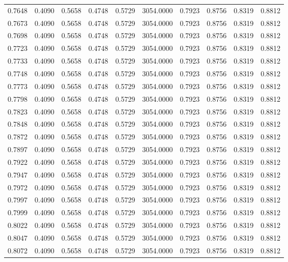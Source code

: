 \begin{tabular}{rrrrrrrrrr}
0.7648 & 0.4090 & 0.5658 & 0.4748 & 0.5729 & 3054.0000 & 0.7923 & 0.8756 & 0.8319 & 0.8812 \\
0.7673 & 0.4090 & 0.5658 & 0.4748 & 0.5729 & 3054.0000 & 0.7923 & 0.8756 & 0.8319 & 0.8812 \\
0.7698 & 0.4090 & 0.5658 & 0.4748 & 0.5729 & 3054.0000 & 0.7923 & 0.8756 & 0.8319 & 0.8812 \\
0.7723 & 0.4090 & 0.5658 & 0.4748 & 0.5729 & 3054.0000 & 0.7923 & 0.8756 & 0.8319 & 0.8812 \\
0.7733 & 0.4090 & 0.5658 & 0.4748 & 0.5729 & 3054.0000 & 0.7923 & 0.8756 & 0.8319 & 0.8812 \\
0.7748 & 0.4090 & 0.5658 & 0.4748 & 0.5729 & 3054.0000 & 0.7923 & 0.8756 & 0.8319 & 0.8812 \\
0.7773 & 0.4090 & 0.5658 & 0.4748 & 0.5729 & 3054.0000 & 0.7923 & 0.8756 & 0.8319 & 0.8812 \\
0.7798 & 0.4090 & 0.5658 & 0.4748 & 0.5729 & 3054.0000 & 0.7923 & 0.8756 & 0.8319 & 0.8812 \\
0.7823 & 0.4090 & 0.5658 & 0.4748 & 0.5729 & 3054.0000 & 0.7923 & 0.8756 & 0.8319 & 0.8812 \\
0.7848 & 0.4090 & 0.5658 & 0.4748 & 0.5729 & 3054.0000 & 0.7923 & 0.8756 & 0.8319 & 0.8812 \\
0.7872 & 0.4090 & 0.5658 & 0.4748 & 0.5729 & 3054.0000 & 0.7923 & 0.8756 & 0.8319 & 0.8812 \\
0.7897 & 0.4090 & 0.5658 & 0.4748 & 0.5729 & 3054.0000 & 0.7923 & 0.8756 & 0.8319 & 0.8812 \\
0.7922 & 0.4090 & 0.5658 & 0.4748 & 0.5729 & 3054.0000 & 0.7923 & 0.8756 & 0.8319 & 0.8812 \\
0.7947 & 0.4090 & 0.5658 & 0.4748 & 0.5729 & 3054.0000 & 0.7923 & 0.8756 & 0.8319 & 0.8812 \\
0.7972 & 0.4090 & 0.5658 & 0.4748 & 0.5729 & 3054.0000 & 0.7923 & 0.8756 & 0.8319 & 0.8812 \\
0.7997 & 0.4090 & 0.5658 & 0.4748 & 0.5729 & 3054.0000 & 0.7923 & 0.8756 & 0.8319 & 0.8812 \\
0.7999 & 0.4090 & 0.5658 & 0.4748 & 0.5729 & 3054.0000 & 0.7923 & 0.8756 & 0.8319 & 0.8812 \\
0.8022 & 0.4090 & 0.5658 & 0.4748 & 0.5729 & 3054.0000 & 0.7923 & 0.8756 & 0.8319 & 0.8812 \\
0.8047 & 0.4090 & 0.5658 & 0.4748 & 0.5729 & 3054.0000 & 0.7923 & 0.8756 & 0.8319 & 0.8812 \\
0.8072 & 0.4090 & 0.5658 & 0.4748 & 0.5729 & 3054.0000 & 0.7923 & 0.8756 & 0.8319 & 0.8812 \\

\end{tabular}
